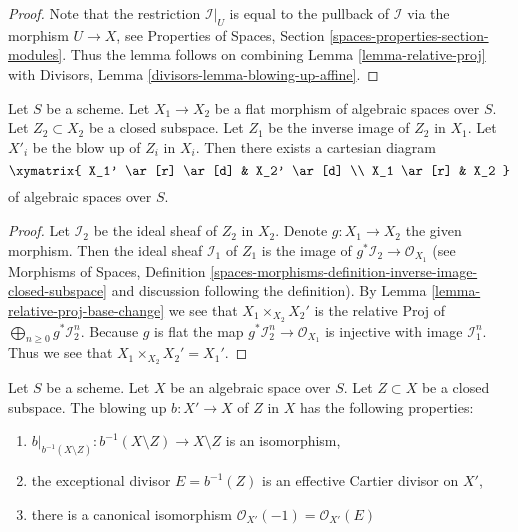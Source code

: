 \begin{proof}
Note that the restriction $\mathcal{I}|_U$ is equal to the pullback
of $\mathcal{I}$ via the morphism $U \to X$, see
Properties of Spaces, Section \ref{spaces-properties-section-modules}.
Thus the lemma follows on combining Lemma \ref{lemma-relative-proj} with
Divisors, Lemma \ref{divisors-lemma-blowing-up-affine}.
\end{proof}

\begin{lemma}
\label{lemma-flat-base-change-blowing-up}
Let $S$ be a scheme.
Let $X_1 \to X_2$ be a flat morphism of algebraic spaces over $S$.
Let $Z_2 \subset X_2$ be a closed subspace.
Let $Z_1$ be the inverse image of $Z_2$ in $X_1$.
Let $X'_i$ be the blow up of $Z_i$ in $X_i$. Then there exists a cartesian
diagram
$$
\xymatrix{
X_1' \ar[r] \ar[d] & X_2' \ar[d] \\
X_1 \ar[r] & X_2
}
$$
of algebraic spaces over $S$.
\end{lemma}

\begin{proof}
Let $\mathcal{I}_2$ be the ideal sheaf of $Z_2$ in $X_2$.
Denote $g : X_1 \to X_2$ the given morphism. Then the ideal sheaf
$\mathcal{I}_1$ of $Z_1$ is the image of
$g^*\mathcal{I}_2 \to \mathcal{O}_{X_1}$
(see Morphisms of Spaces, Definition
\ref{spaces-morphisms-definition-inverse-image-closed-subspace}
and discussion following the definition).
By Lemma \ref{lemma-relative-proj-base-change}
we see that $X_1 \times_{X_2} X_2'$ is the relative Proj of
$\bigoplus_{n \geq 0} g^*\mathcal{I}_2^n$. Because $g$ is flat the map
$g^*\mathcal{I}_2^n \to \mathcal{O}_{X_1}$ is injective with image
$\mathcal{I}_1^n$. Thus we see that $X_1 \times_{X_2} X_2' = X_1'$.
\end{proof}

\begin{lemma}
\label{lemma-blowing-up-gives-effective-Cartier-divisor}
Let $S$ be a scheme. Let $X$ be an algebraic space over $S$.
Let $Z \subset X$ be a closed subspace.
The blowing up $b : X' \to X$ of $Z$ in $X$
has the following properties:
\begin{enumerate}
\item $b|_{b^{-1}(X \setminus Z)} : b^{-1}(X \setminus Z) \to X \setminus Z$
is an isomorphism,
\item the exceptional divisor $E = b^{-1}(Z)$ is an effective Cartier divisor
on $X'$,
\item there is a canonical isomorphism
$\mathcal{O}_{X'}(-1) = \mathcal{O}_{X'}(E)$
\end{enumerate}
\end{lemma}

